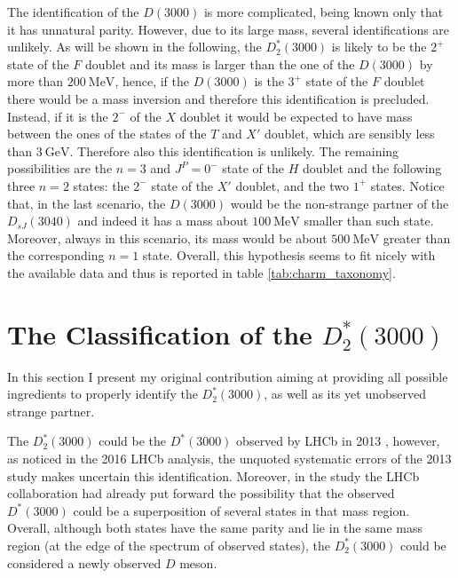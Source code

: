 The identification of the $D(3000)$ is more complicated, being known only that it has unnatural parity. However, due to its large mass, several identifications are unlikely. As will be shown in the following, the $D^*_2(3000)$ is likely to be the $2^+$ state of the $F$ doublet and its mass is larger than the one of the $D(3000)$ by more than $200 \ \text{MeV}$, hence, if the $D(3000)$ is the $3^+$ state of the $F$ doublet there would be a mass inversion and therefore this identification is precluded. Instead, if it is the $2^-$ of the $X$ doublet it would be expected to have mass between the ones of the states of the $T$ and $X'$ doublet, which are sensibly less than $3 \ \text{GeV}$. Therefore also this identification is unlikely. The remaining possibilities are the $n = 3$ and $J^P = 0^-$ state of the $H$ doublet\footnotemark{} and the following three $n = 2$ states: the $2^-$ state of the $X'$ doublet, and the two $1^+$ states. Notice that, in the last scenario, the $D(3000)$ would be the non-strange partner of the $D_{s J}(3040)$ and indeed it has a mass about $100 \ \text{MeV}$ smaller than such state. Moreover, always in this scenario, its mass would be about $500 \ \text{MeV}$ greater than the corresponding $n = 1$ state. Overall, this hypothesis seems to fit nicely with the available data and thus is reported in table \ref{tab:charm_taxonomy}.

\section{The Classification of the $D^*_2(3000)$}

In this section I present my original contribution aiming at providing all possible ingredients to properly identify the $D^*_2(3000)$, as well as its yet unobserved strange partner.

The $D_2^*(3000)$ could be the $D^*(3000)$ observed by LHCb in 2013 \cite{Aaij:2013sza}, however, as noticed in the 2016 LHCb analysis, the unquoted systematic errors of the 2013 study makes uncertain this identification. Moreover, in the study \cite{Aaij:2013sza} the LHCb collaboration had already put forward the possibility that the observed $D^*(3000)$ could be a superposition of several states in that mass region. Overall, although both states have the same parity and lie in the same mass region (at the edge of the spectrum of observed states), the $D_2^*(3000)$ could be considered a newly observed $D$ meson. 

